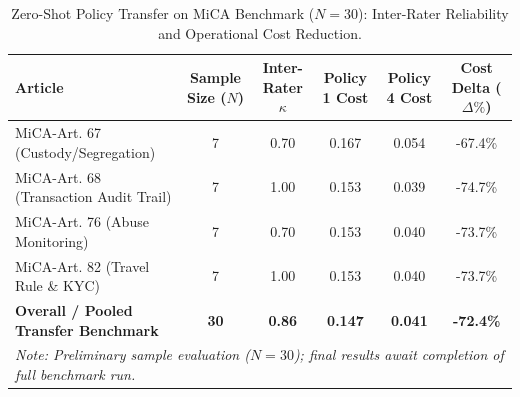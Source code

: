 \begin{table}[t]
\centering
\small
\caption{Zero-Shot Policy Transfer on MiCA Benchmark ($N=30$): Inter-Rater Reliability and Operational Cost Reduction.}
\label{tab:mica_transfer}
\begin{tabular}{lccccc}
\toprule
\textbf{Article} & \textbf{Sample Size ($N$)} & \textbf{Inter-Rater $\kappa$} & \textbf{Policy 1 Cost} & \textbf{Policy 4 Cost} & \textbf{Cost Delta ($\Delta\%$)} \\
\midrule
MiCA-Art. 67 (Custody/Segregation) & 7 & 0.70 & 0.167 & 0.054 & -67.4\% \\
MiCA-Art. 68 (Transaction Audit Trail) & 7 & 1.00 & 0.153 & 0.039 & -74.7\% \\
MiCA-Art. 76 (Abuse Monitoring) & 7 & 0.70 & 0.153 & 0.040 & -73.7\% \\
MiCA-Art. 82 (Travel Rule \& KYC) & 7 & 1.00 & 0.153 & 0.040 & -73.7\% \\
\midrule
\textbf{Overall / Pooled Transfer Benchmark} & \textbf{30} & \textbf{0.86} & \textbf{0.147} & \textbf{0.041} & \textbf{-72.4\%} \\
\multicolumn{6}{l}{\textit{Note: Preliminary sample evaluation ($N=30$); final results await completion of full benchmark run.}} \\
\bottomrule
\end{tabular}
\end{table}
